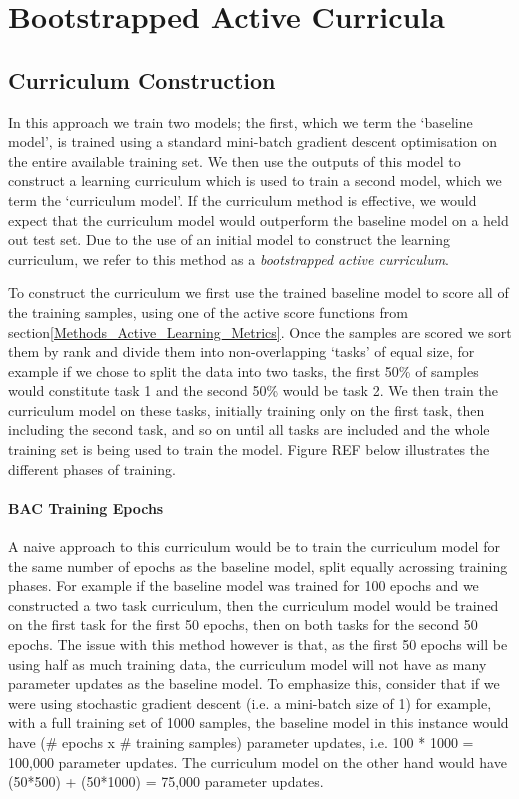 \chapter{Bootstrapped Active Curricula}
\section{Curriculum Construction}
In this approach we train two models; the first, which we term the `baseline model', is trained using a standard mini-batch gradient descent optimisation on the entire available training set. We then use the outputs of this model to construct a learning curriculum which is used to train a second model, which we term the `curriculum model'. If the curriculum method is effective, we would expect that the curriculum model would outperform the baseline model on a held out test set. Due to the use of an initial model to construct the learning curriculum, we refer to this method as a \textit{bootstrapped active curriculum}.

To construct the curriculum we first use the trained baseline model to score all of the training samples, using one of the active score functions from section\ref{Methods_Active_Learning_Metrics}. Once the samples are scored we sort them by rank and divide them into non-overlapping `tasks' of equal size, for example if we chose to split the data into two tasks, the first 50\% of samples would constitute task 1 and the second 50\% would be task 2. We then train the curriculum model on these tasks, initially training only on the first task, then including the second task, and so on until all tasks are included and the whole training set is being used to train the model. Figure REF below illustrates the different phases of training.

\subsubsection{BAC Training Epochs}
A naive approach to this curriculum would be to train the curriculum model for the same number of epochs as the baseline model, split equally acrossing training phases. For example if the baseline model was trained for 100 epochs and we constructed a two task curriculum, then the curriculum model would be trained on the first task for the first 50 epochs, then on both tasks for the second 50 epochs. The issue with this method however is that, as the first 50 epochs will be using half as much training data, the curriculum model will not have as many parameter updates as the baseline model. To emphasize this, consider that if we were using stochastic gradient descent (i.e. a mini-batch size of 1) for example, with a full training set of 1000 samples, the baseline model in this instance would have (\# epochs x \# training samples) parameter updates, i.e. 100 * 1000 = 100,000 parameter updates. The curriculum model on the other hand would have (50*500) + (50*1000) = 75,000 parameter updates.


